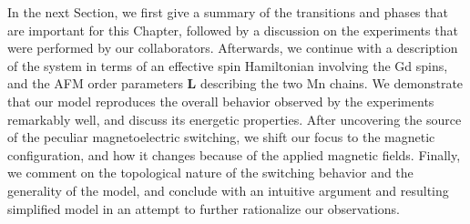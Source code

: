 In the next Section, we first give a summary of the transitions and phases that are important for this Chapter, followed by a discussion on the experiments that were performed by our collaborators.
Afterwards, we continue with a description of the system in terms of an effective spin Hamiltonian involving the Gd spins, and the AFM order parameters $\bm L$ describing the two Mn chains.
We demonstrate that our model reproduces the overall behavior observed by the experiments remarkably well, and discuss its energetic properties.
After uncovering the source of the peculiar magnetoelectric switching, we shift our focus to the magnetic configuration, and how it changes because of the applied magnetic fields.
Finally, we comment on the topological nature of the switching behavior and the generality of the model, and conclude with an intuitive argument and resulting simplified model in an attempt to further rationalize our observations. 

